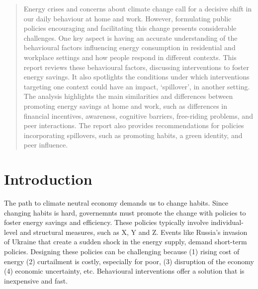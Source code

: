 \documentclass[
  11pt,
]{article}
\begin{document}
\begin{abstract}
Energy crises and concerns about climate change call for a decisive
shift in our daily behaviour at home and work. However, formulating
public policies encouraging and facilitating this change presents
considerable challenges. One key aspect is having an accurate
understanding of the behavioural factors influencing energy consumption
in residential and workplace settings and how people respond in
different contexts. This report reviews these behavioural factors,
discussing interventions to foster energy savings. It also spotlights
the conditions under which interventions targeting one context could
have an impact, `spillover', in another setting. The analysis highlights
the main similarities and differences between promoting energy savings
at home and work, such as differences in financial incentives,
awareness, cognitive barriers, free-riding problems, and peer
interactions. The report also provides recommendations for policies
incorporating spillovers, such as promoting habits, a green identity,
and peer influence.
\end{abstract}

\newpage 



\renewcommand*\contentsname{Table of Contents}
\tableofcontents
\listoffigures
\listoftables
\clearpage 


\hypertarget{introduction}{%
\section{Introduction}\label{introduction}}

The path to climate neutral economy demands us to change habits. Since
changing habits is hard, governemnts must promote the change with
policies to foster energy savings and efficiency. These policies
typically involve individual-level and structural measures, such as X, Y
and Z. Events like Russia's invasion of Ukraine that create a sudden
shock in the energy supply, demand short-term policies. Designing these
policies can be challenging because (1) rising cost of energy (2)
curtailment is costly, especially for poor, (3) disruption of the
economy (4) economic uncertainty, etc. Behavioural interventions offer a
solution that is inexpensive and fast.
\end{document}
